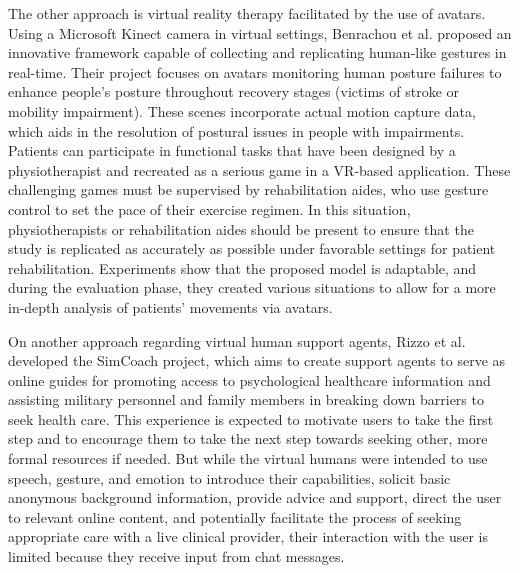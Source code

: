 The other approach is virtual reality therapy facilitated by the use of avatars. Using a Microsoft Kinect camera in virtual settings, Benrachou et al. \cite{BEN20} proposed an innovative framework capable of collecting and replicating human-like gestures in real-time. Their project focuses on avatars monitoring human posture failures to enhance people's posture throughout recovery stages (victims of stroke or mobility impairment). These scenes incorporate actual motion capture data, which aids in the resolution of postural issues in people with impairments. Patients can participate in functional tasks that have been designed by a physiotherapist and recreated as a serious game in a VR-based application. These challenging games must be supervised by rehabilitation aides, who use gesture control to set the pace of their exercise regimen. In this situation, physiotherapists or rehabilitation aides should be present to ensure that the study is replicated as accurately as possible under favorable settings for patient rehabilitation. Experiments show that the proposed model is adaptable, and during the evaluation phase, they created various situations to allow for a more in-depth analysis of patients' movements via avatars.

On another approach regarding virtual human support agents, Rizzo et al. \cite{RIZ11} developed the SimCoach project, which aims to create support agents to serve as online guides for promoting access to psychological healthcare information and assisting military personnel and family members in breaking down barriers to seek health care. This experience is expected to motivate users to take the first step and to encourage them to take the next step towards seeking other, more formal resources if needed. But while the virtual humans were intended to use speech, gesture, and emotion to introduce their capabilities, solicit basic anonymous background information, provide advice and support, direct the user to relevant online content, and potentially facilitate the process of seeking appropriate care with a live clinical provider, their interaction with the user is limited because they receive input from chat messages.

